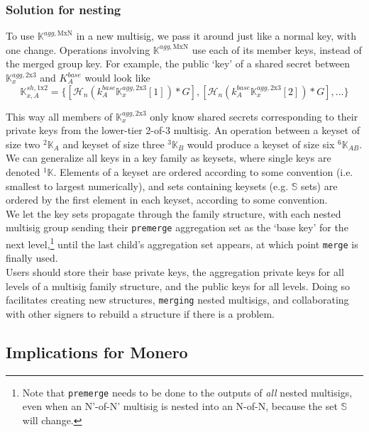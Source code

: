 \subsubsection*{Solution for nesting}

To use $\mathbb{K}^{agg,\textrm{MxN}}$ in a new multisig, we pass it around just like a normal key, with one change. Operations involving $\mathbb{K}^{agg,\textrm{MxN}}$ use each of its member keys, instead of the merged group key. For example, the public `key' of a shared secret between $\mathbb{K}^{agg,\textrm{2x3}}_x$ and $K^{base}_A$ would look like\vspace{.175cm}
\[\mathbb{K}^{sh,\textrm{1x2}}_{x,A} = \{ [\mathcal{H}_n(k^{base}_A \mathbb{K}^{agg,\textrm{2x3}}_x[1])*G], [\mathcal{H}_n(k^{base}_A \mathbb{K}^{agg,\textrm{2x3}}_x[2])*G], ...\}\]

This way all members of $\mathbb{K}^{agg,\textrm{2x3}}_x$ only know shared secrets corresponding to their private keys from the lower-tier 2-of-3 multisig. An operation between a keyset of size two ${}^{2}\mathbb{K}_A$ and keyset of size three ${}^{3}\mathbb{K}_B$ would produce a keyset of size six ${}^{6}\mathbb{K}_{AB}$. We can generalize all keys in a key family as keysets, where single keys are denoted ${}^{1}\mathbb{K}$. Elements of a keyset are ordered according to some convention (i.e. smallest to largest numerically), and sets containing keysets (e.g. $\mathbb{S}$ sets) are ordered by the first element in each keyset, according to some convention.\\

We let the key sets propagate through the family structure, with each nested multisig group sending their {\tt premerge} aggregation set as the `base key' for the next level,\footnote{Note that {\tt premerge} needs to be done to the outputs of {\em all} nested multisigs, even when an N'-of-N' multisig is nested into an N-of-N, because the set $\mathbb{S}$ will change.} until the last child's aggregation set appears, at which point {\tt merge} is finally used.\\

Users should store their base private keys, the aggregation private keys for all levels of a multisig family structure, and the public keys for all levels. Doing so facilitates creating new structures, {\tt merging} nested multisigs, and collaborating with other signers to rebuild a structure if there is a problem.


\subsection{Implications for Monero}


